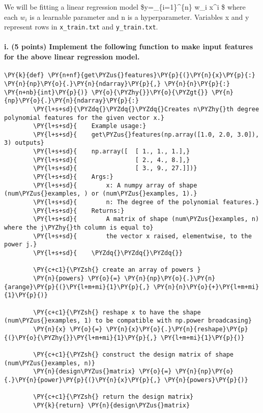 \documentclass[a4paper,11pt]{article}%
\begin{document}
We will be fitting a linear regression model \$y=\sum\_\{i=1\}\^{}\{n\}
w\_i x\^{}i \$ where each \(w_i\) is a learnable parameter and n is a
hyperparameter. Variables x and y represent rows in
\texttt{x\_train.txt} and \texttt{y\_train.txt}.

\hypertarget{i.-5-points-implement-the-following-function-to-make-input-features-for-the-above-linear-regression-model.}{%
	\paragraph{i. (5 points) Implement the following function to make input
		features for the above linear regression
		model.}\label{i.-5-points-implement-the-following-function-to-make-input-features-for-the-above-linear-regression-model.}}

\begin{tcolorbox}[breakable, size=fbox, boxrule=1pt, pad at break*=1mm,colback=cellbackground, colframe=cellborder]
	\begin{Verbatim}[commandchars=\\\{\}]
		\PY{k}{def} \PY{n+nf}{get\PYZus{}features}\PY{p}{(}\PY{n}{x}\PY{p}{:} \PY{n}{np}\PY{o}{.}\PY{n}{ndarray}\PY{p}{,} \PY{n}{n}\PY{p}{:} \PY{n+nb}{int}\PY{p}{)} \PY{o}{\PYZhy{}}\PY{o}{\PYZgt{}} \PY{n}{np}\PY{o}{.}\PY{n}{ndarray}\PY{p}{:}
		\PY{l+s+sd}{\PYZdq{}\PYZdq{}\PYZdq{}Creates n\PYZhy{}th degree polynomial features for the given vector x.}
		\PY{l+s+sd}{    Example usage:}
		\PY{l+s+sd}{    get\PYZus{}features(np.array([1.0, 2.0, 3.0]), 3) outputs}
		\PY{l+s+sd}{    np.array([  [ 1., 1., 1.],}
		\PY{l+s+sd}{                [ 2., 4., 8.],}
		\PY{l+s+sd}{                [ 3., 9., 27.]])}
		\PY{l+s+sd}{    Args:}
		\PY{l+s+sd}{        x: A numpy array of shape (num\PYZus{}examples, ) or (num\PYZus{}examples, 1).}
		\PY{l+s+sd}{        n: The degree of the polynomial features.}
		\PY{l+s+sd}{    Returns:}
		\PY{l+s+sd}{        A matrix of shape (num\PYZus{}examples, n) where the j\PYZhy{}th column is equal to}
		\PY{l+s+sd}{        the vector x raised, elementwise, to the power j.}
		\PY{l+s+sd}{    \PYZdq{}\PYZdq{}\PYZdq{}}
		
		\PY{c+c1}{\PYZsh{} create an array of powers }
		\PY{n}{powers} \PY{o}{=} \PY{n}{np}\PY{o}{.}\PY{n}{arange}\PY{p}{(}\PY{l+m+mi}{1}\PY{p}{,} \PY{n}{n}\PY{o}{+}\PY{l+m+mi}{1}\PY{p}{)}
		
		\PY{c+c1}{\PYZsh{} reshape x to have the shape (num\PYZus{}examples, 1) to be compatible with np.power broadcasing}
		\PY{n}{x} \PY{o}{=} \PY{n}{x}\PY{o}{.}\PY{n}{reshape}\PY{p}{(}\PY{o}{\PYZhy{}}\PY{l+m+mi}{1}\PY{p}{,} \PY{l+m+mi}{1}\PY{p}{)}
		
		\PY{c+c1}{\PYZsh{} construct the design matrix of shape (num\PYZus{}examples, n)}
		\PY{n}{design\PYZus{}matrix} \PY{o}{=} \PY{n}{np}\PY{o}{.}\PY{n}{power}\PY{p}{(}\PY{n}{x}\PY{p}{,} \PY{n}{powers}\PY{p}{)}
		
		\PY{c+c1}{\PYZsh{} return the design matrix}
		\PY{k}{return} \PY{n}{design\PYZus{}matrix}
	\end{Verbatim}
\end{tcolorbox}
\end{document}
